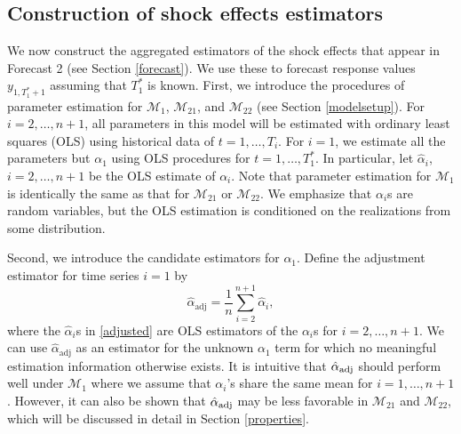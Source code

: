 \documentclass[11pt]{article}
\def\mc#1{\mathcal{#1}} %
\theoremstyle{definition}
\begin{document}
\subsection{Construction of shock effects estimators}
\label{constructionofestimators}

We now construct the aggregated estimators of the shock effects that appear in Forecast 2 (see Section \ref{forecast}). We use these to forecast response values $y_{1, T_1^*+1}$ assuming that $T_1^*$ is known.  First, we introduce the procedures of parameter estimation for $\mc{M}_1$, $\mc{M}_{21}$, and $\mc{M}_{22}$ (see Section \ref{modelsetup}). For $i = 2, \ldots, n+1$, all parameters in this model will be estimated with ordinary least squares (OLS) using historical data of $t = 1, \ldots, T_i$. For $i = 1$, we estimate all the parameters but $\alpha_1$ using OLS procedures for $t=1, \ldots, T_1^*$. In particular, let $\hat{\alpha}_i$, $i = 2, \ldots, n+1$ be the OLS estimate of $\alpha_i$.  Note that parameter estimation for $\mc{M}_1$ is identically the same as that for $\mc{M}_{21}$ or $\mc{M}_{22}$.  We emphasize that $\alpha_i$s are random variables, but the OLS estimation is conditioned on the realizations from some distribution.


Second, we introduce the candidate estimators for $\alpha_1$. Define the 
adjustment estimator for time series $i=1$ by
\begin{equation} \label{adjusted}
  \hat{\alpha}_{\text{adj}} = \frac{1}{n}\sum_{i=2}^{n+1}\hat{\alpha}_i,
\end{equation}
where the $\hat{\alpha}_i$s in \eqref{adjusted} are OLS estimators of  
the $\alpha_i$s for $i = 2, \ldots, n+1$.  We can use $\hat{\alpha}_{\text{adj}}$ as an estimator for 
the unknown $\alpha_1$ term for which no meaningful estimation information 
otherwise exists. It is intuitive that $\hat{\alpha}_{\rm adj}$ should perform 
well under $\mc{M}_1$ where we assume that $\alpha_i$'s share the same mean 
for $i= 1, \ldots, n+1$. However, it can also be shown that 
$\hat{\alpha}_{\rm adj}$ may be less favorable in $\mc{M}_{21}$ 
and $\mc{M}_{22}$, which will be discussed in detail in Section \ref{properties}. 
\end{document}
